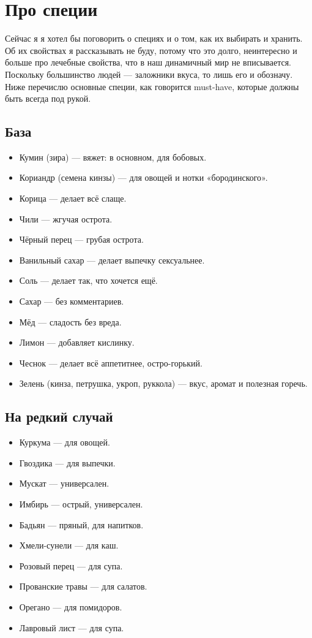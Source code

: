 \section{Про специи}
Сейчас я я хотел бы поговорить о специях и о том, как их выбирать и хранить. Об их свойствах я рассказывать не буду, потому что это долго, неинтересно и больше про лечебные свойства, что в наш динамичный мир не вписывается. Поскольку большинство людей — заложники вкуса, то лишь его и обозначу. Ниже перечислю основные специи, как говорится must-have, которые должны быть всегда под рукой.

\subsection{База}
\begin{itemize}
\item Кумин (зира) — вяжет: в основном, для бобовых.
\item Кориандр (семена кинзы) — для овощей и нотки «бородинского».
\item Корица — делает всё слаще.
\item Чили — жгучая острота.
\item Чёрный перец — грубая острота.
\item Ванильный сахар — делает выпечку сексуальнее.
\item Соль — делает так, что хочется ещё.
\item Сахар — без комментариев.
\item Мёд — сладость без вреда.
\item Лимон — добавляет кислинку.
\item Чеснок — делает всё аппетитнее, остро-горький.
\item Зелень (кинза, петрушка, укроп, руккола) — вкус, аромат и полезная горечь.
\end{itemize}

\subsection{На редкий случай}
\begin{itemize}
\item Куркума — для овощей.
\item Гвоздика — для выпечки.
\item Мускат — универсален.
\item Имбирь — острый, универсален.
\item Бадьян — пряный, для напитков.
\item Хмели-сунели — для каш.
\item Розовый перец — для супа.
\item Прованские травы — для салатов.
\item Орегано — для помидоров.
\item Лавровый лист — для супа.
\end{itemize}

